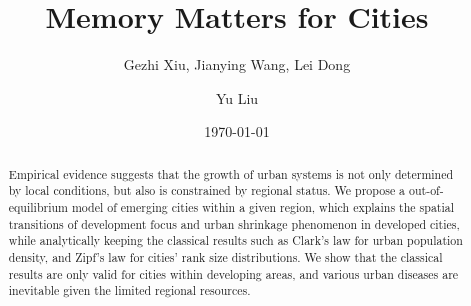 \documentclass[reprint,unsortedaddress,amsmath,amssymb,floatfix,aps,prl,showkeys]{revtex4-2}
\begin{document}
\title{Memory Matters for Cities}
\author{Gezhi Xiu, Jianying Wang, Lei Dong}
\author{Yu Liu}
\date{\today}

\begin{abstract}
	Empirical evidence suggests that the growth of urban systems is not only determined by local conditions, but also is constrained by regional status. We propose a out-of-equilibrium model of emerging cities within a given region, which explains the spatial transitions of development focus and urban shrinkage phenomenon in developed cities, while analytically keeping the classical results such as Clark's law for urban population density, and Zipf's law for cities' rank size distributions. We show that the classical results are only valid for cities within developing areas, and various urban diseases are inevitable given the limited regional resources. 
\end{abstract}

\maketitle
\end{document}
